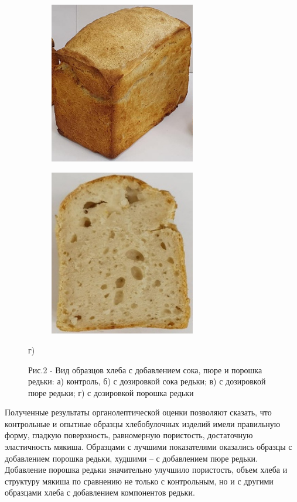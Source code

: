 \begin{figure}[H]
	\centering
	\begin{subfigure}{0.48\textwidth}
		\centering
		\includegraphics[width=0.7\textwidth,height=0.7\textwidth]{media/pish/image67}
	\end{subfigure}
	\begin{subfigure}{0.48\textwidth}
		\centering
		\includegraphics[width=0.7\textwidth,height=0.7\textwidth]{media/pish/image68}
	\end{subfigure}
	\caption*{г)}
	\caption*{Рис.2 - Вид образцов хлеба с добавлением сока, пюре и порошка редьки: а) контроль, б) с дозировкой сока редьки; в) с дозировкой пюре редьки; г) с дозировкой порошка редьки}
\end{figure}

\begin{multicols}{2}
Полученные результаты органолептической оценки позволяют сказать, что
контрольные и опытные образцы хлебобулочных изделий имели правильную
форму, гладкую поверхность, равномерную пористость, достаточную
эластичность мякиша. Образцами с лучшими показателями оказались образцы
с добавлением порошка редьки, худшими -- с добавлением пюре редьки.
Добавление порошка редьки значительно улучшило пористость, объем хлеба и
структуру мякиша по сравнению не только с контрольным, но и с другими
образцами хлеба с добавлением компонентов редьки.
\end{multicols}

